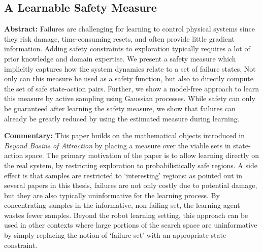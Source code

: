 \subsection{A Learnable Safety Measure}
\textbf{Abstract: }
Failures are challenging for learning to control physical systems since they risk damage, time-consuming resets, and often provide little gradient information. Adding safety constraints to exploration typically requires a lot of prior knowledge and domain expertise. We present a safety measure which implicitly captures how the system dynamics relate to a set of failure states. Not only can this measure be used as a safety function, but also to directly compute the set of safe state-action pairs. Further, we show a model-free approach to learn this measure by active sampling using Gaussian processes. While safety can only be guaranteed after learning the safety measure, we show that failures can already be greatly reduced by using the estimated measure during learning. \par
\textbf{Commentary: }
This paper builds on the mathematical objects introduced in \emph{Beyond Basins of Attraction} by placing a measure over the viable sets in state-action space. The primary motivation of the paper is to allow learning directly on the real system, by restricting exploration to probabilistically safe regions. A side effect is that samples are restricted to `interesting' regions: as pointed out in several papers in this thesis, failures are not only costly due to potential damage, but they are also typically uninformative for the learning process. By concentrating samples in the informative, non-failing set, the learning agent wastes fewer samples. Beyond the robot learning setting, this approach can be used in other contexts where large portions of the search space are uninformative by simply replacing the notion of `failure set' with an appropriate state-constraint.
